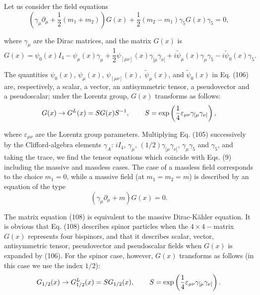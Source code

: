 \documentclass[a4paper,12pt]{article}
\begin{document}
Let us consider the field equations
\begin{equation}
\left( \gamma _\mu \partial _\mu +\frac 12\left( m_1+m_2\right)
\right) G(x)+\frac 12\left( m_2-m_1\right) \gamma _5G(x)\gamma
_5=0  ,\label{105}
\end{equation}

where $\gamma _\mu $ are the Dirac matrices, and the matrix $G(x)$ is
\begin{equation}
G(x)=\psi _0(x)I_4-\psi _\mu (x)\gamma _\mu +\frac 12\psi _{[\mu
\nu ]}(x)\gamma _{[\mu }\gamma _{\nu ]}+i\widetilde{\psi }_\mu
(x)\gamma _\mu \gamma _5-i\widetilde{\psi }_0(x)\gamma _5
.\label{106}
\end{equation}

The quantities $\psi _0(x)$, $\psi _\mu (x)$, $\psi _{[\mu \nu
]}(x),$ $ \widetilde{\psi }_\mu (x)$, and $\widetilde{\psi }_0(x)$
in Eq. (106) are, respectively, a scalar, a vector, an
antisymmetric tensor, a pseudovector and a pseudoscalar; under the
Lorentz group, $G(x)$ transforms as follows:
\begin{equation}
G(x)\rightarrow G^L(x)=SG(x)S^{-1} ,\hspace{0.3in}S=\exp \left(
\frac 14\varepsilon _{\mu \nu }\gamma _{[\mu }\gamma _{\nu
]}\right)  , \label{107}
\end{equation}

where $\varepsilon _{\mu \nu }$ are the Lorentz group parameters.
Multiplying Eq. (105) successively by the Clifford-algebra
elements $\gamma _A$: $iI_4$, $ \gamma _\mu $, $(1/2)\gamma _{[\mu
}\gamma _{\nu ]}$, $\gamma _\mu \gamma _5$ and $\gamma _5$, and
taking the trace, we find the tensor equations which coincide with
Eqs. (9) including the massive and massless cases. The case of a
massless field corresponds to the choice $m_1=0$, while a massive
field (at $m_1=m_2=m$) is described by an equation of the type
\begin{equation}
\left( \gamma _\mu \partial _\mu +m\right) G(x)=0  .\label{108}
\end{equation}

The matrix equation (108) is equivalent to the massive
Dirac-K\"ahler equation. It is obvious that Eq. (108) describes
spinor particles when the $ 4\times 4-$matrix $G(x)$ represents
four bispinors, and that it describes scalar, vector,
antisymmetric tensor, pseudovector and pseudoscalar fields when
$G(x)$ is expanded by (106). For the spinor case, however, $G(x)$
transforms as follows (in this case we use the index $1/2$):
\begin{equation}
G_{1/2}(x)\rightarrow G_{1/2}^L(x)=SG_{1/2}(x) ,
\hspace{0.3in}S=\exp \left( \frac 14\varepsilon _{\mu \nu }\gamma
_{[\mu }\gamma _{\nu ]}\right) .  \label{109}
\end{equation}
\end{document}
